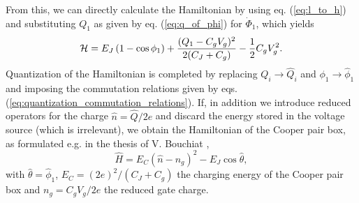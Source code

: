 %
From this, we can directly calculate the Hamiltonian by using eq. (\ref{eq:l_to_h}) and substituting $Q_1$ as given by eq. (\ref{eq:q_of_phi}) for $\dot{\Phi}_1$, which yields
%
\begin{equation}
\begin{mathcal}H\end{mathcal} = E_J\left(1-\cos{\phi_1}\right)+\frac{(Q_1-C_g V_g)^2}{2(C_J+C_g)}-\frac{1}{2}C_g V_g^2.
\end{equation}
%
Quantization of the Hamiltonian is completed by replacing $Q_i\to \hat{Q}_i$ and $\phi_1\to\hat{\phi}_1$ and imposing the commutation relations given by eqs. (\ref{eq:quantization_commutation_relations}). If, in addition we introduce reduced operators for the charge $\hat{n}=\hat{Q}/2e$ and discard the energy stored in the voltage source (which is irrelevant), we obtain the Hamiltonian of the Cooper pair box, as formulated e.g. in the thesis of V. Bouchiat \citep{bouchiat_quantum_1998},
%
\begin{equation}
\hat{H} = E_C \left( \hat{n} - n_g\right)^2-E_J \cos{\hat{\theta}}, \label{eq:cpb_hamiltonian}
\end{equation}
%
with $\hat{\theta}=\hat{\phi}_1$, $E_C = (2e)^2 / (C_J+C_g)$ the charging energy of the Cooper pair box and $n_g=C_g V_g /2e $ the reduced gate charge.

\smallskip

